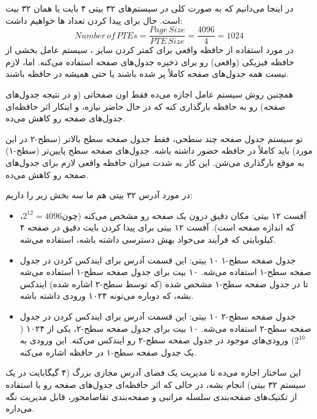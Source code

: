 در اینجا می‌دانیم که به صورت کلی در سیستم‌های ۳۲ بیتی
۴ بایت یا همان ۳۲ بیت است.
حال برای پیدا کردن تعداد
ها
خواهیم داشت:
\[
    Number\,of\,PTEs = \frac{Page\,Size}{PTE\,Size} = \frac{4096}{4} = 1024
\]
در مورد استفاده از حافظه واقعی برای کمتر کردن سایز
،
سیستم عامل بخشی از حافظه فیزیکی (واقعی) رو برای ذخیره جدول‌های صفحه استفاده می‌کنه. اما، لازم نیست همه جدول‌های صفحه کاملاً پر شده باشند یا حتی همیشه در حافظه باشند.

همچنین روش
سیستم عامل اجازه می‌ده فقط اون صفحاتی (و در نتیجه جدول‌های صفحه) رو به حافظه بارگذاری کنه که در حال حاضر نیازه، و اینکار اثر حافظه‌ای جدول‌های صفحه رو کاهش می‌ده.

تو سیستم جدول صفحه چند سطحی، فقط جدول صفحه سطح بالاتر (سطح-۲ در این مورد) باید کاملاً در حافظه حضور داشته باشه. جدول‌های صفحه سطح پایین‌تر (سطح-۱) به موقع بارگذاری می‌شن. این کار به شدت میزان حافظه واقعی لازم برای جدول‌های صفحه رو کاهش می‌ده.

در مورد آدرس ۳۲ بیتی هم ما سه بخش زیر را داریم:
\begin{itemize}
    \item
    آفست ۱۲ بیتی: مکان دقیق درون یک صفحه رو مشخص می‌کنه (چون$2^{12} = 4096$، که اندازه صفحه است).
    آفست ۱۲ بیتی برای پیدا کردن بایت دقیق در صفحه ۴ کیلوبایتی که فرآیند می‌خواد بهش دسترسی داشته باشه، استفاده می‌شه.
    \item
    جدول صفحه سطح-۱ ۱۰ بیتی: این قسمت آدرس برای ایندکس کردن در جدول صفحه سطح-۱ استفاده می‌شه.
    ۱۰ بیت برای جدول صفحه سطح-۱ استفاده می‌شه تا در جدول صفحه سطح-۱ مشخص شده (که توسط  سطح-۲ اشاره شده) ایندکس بشه، که دوباره می‌تونه ۱۰۲۴ ورودی داشته باشه.
    \item
    جدول صفحه سطح-۲ ۱۰ بیتی: این قسمت آدرس برای ایندکس کردن در جدول صفحه سطح-۲ استفاده می‌شه.
    ۱۰ بیت برای جدول صفحه سطح-۲، یکی از ۱۰۲۴ ($2^{10}$) ورودی‌های موجود در جدول صفحه سطح-۲ رو ایندکس می‌کنه. این ورودی به یک جدول صفحه سطح-۱ در حافظه اشاره می‌کنه.
\end{itemize}

این ساختار اجازه می‌ده تا مدیریت یک فضای آدرس مجازی بزرگ (۴ گیگابایت در یک سیستم ۳۲ بیتی) انجام بشه، در حالی که اثر حافظه‌ای جدول‌های صفحه رو با استفاده از تکنیک‌های صفحه‌بندی سلسله مراتبی و صفحه‌بندی تقاضامحور، قابل مدیریت نگه می‌داره.